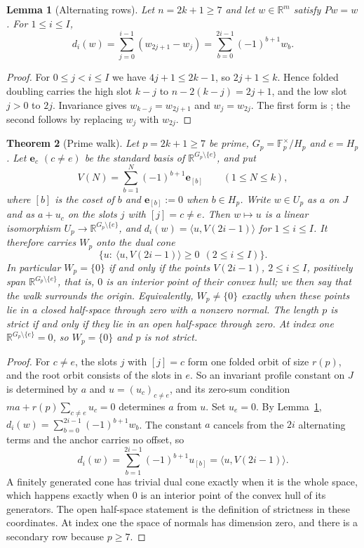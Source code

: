 \documentclass[11pt,reqno]{amsart}
\newtheorem{theorem}{Theorem}
\newtheorem{lemma}[theorem]{Lemma}
\newcommand{\R}{\mathbb R}
\newcommand{\F}{\mathbb F}
\begin{document}
\begin{lemma}[Alternating rows]\label{lem:rows}
Let \(n=2k+1\ge7\) and let \(w\in\R^m\) satisfy \(Pw=w\). For \(1\le i\le I\),
\[
 d_i(w)=\sum_{j=0}^{i-1}(w_{2j+1}-w_j)
       =\sum_{b=0}^{2i-1}(-1)^{b+1}w_b .
\]
\end{lemma}
\begin{proof}
For \(0\le j<i\le I\) we have \(4j+1\le 2k-1\), so \(2j+1\le k\). Hence folded doubling carries the high slot \(k-j\) to \(n-2(k-j)=2j+1\), and the low slot \(j>0\) to \(2j\). Invariance gives \(w_{k-j}=w_{2j+1}\) and \(w_j=w_{2j}\). The first form is \cite[Section~3]{G10}; the second follows by replacing \(w_j\) with \(w_{2j}\).
\end{proof}

\begin{theorem}[Prime walk]\label{th:walk}
Let \(p=2k+1\ge7\) be prime, \(G_p=\F_p^\times/H_p\) and \(e=H_p\). Let \(\mathbf e_c\) \((c\ne e)\) be the standard basis of \(\R^{G_p\setminus\{e\}}\), and put
\[
 V(N)=\sum_{b=1}^{N}(-1)^{b+1}\mathbf e_{[b]}\qquad(1\le N\le k),
\]
where \([b]\) is the coset of \(b\) and \(\mathbf e_{[b]}:=0\) when \(b\in H_p\). Write \(w\in U_p\) as \(a\) on \(J\) and as \(a+u_c\) on the slots \(j\) with \([j]=c\ne e\). Then \(w\mapsto u\) is a linear isomorphism \(U_p\to\R^{G_p\setminus\{e\}}\), and \(d_i(w)=\langle u,V(2i-1)\rangle\) for \(1\le i\le I\). It therefore carries \(W_p\) onto the dual cone
\[
 \{u:\ \langle u,V(2i-1)\rangle\ge0\ \ (2\le i\le I)\}.
\]
In particular \(W_p=\{0\}\) if and only if the points \(V(2i-1)\), \(2\le i\le I\), positively span \(\R^{G_p\setminus\{e\}}\), that is, \(0\) is an interior point of their convex hull; we then say that the walk \emph{surrounds the origin}. Equivalently, \(W_p\ne\{0\}\) exactly when these points lie in a closed half-space through zero with a nonzero normal. The length \(p\) is strict if and only if they lie in an open half-space through zero. At index one \(\R^{G_p\setminus\{e\}}=0\), so \(W_p=\{0\}\) and \(p\) is not strict.
\end{theorem}
\begin{proof}
For \(c\ne e\), the slots \(j\) with \([j]=c\) form one folded orbit of size \(r(p)\), and the root orbit consists of the slots in \(e\). So an invariant profile constant on \(J\) is determined by \(a\) and \(u=(u_c)_{c\ne e}\), and its zero-sum condition \(ma+r(p)\sum_{c\ne e}u_c=0\) determines \(a\) from \(u\). Set \(u_e=0\). By Lemma~\ref{lem:rows}, \(d_i(w)=\sum_{b=0}^{2i-1}(-1)^{b+1}w_b\). The constant \(a\) cancels from the \(2i\) alternating terms and the anchor carries no offset, so
\[
 d_i(w)=\sum_{b=1}^{2i-1}(-1)^{b+1}u_{[b]}=\langle u,V(2i-1)\rangle .
\]
A finitely generated cone has trivial dual cone exactly when it is the whole space, which happens exactly when \(0\) is an interior point of the convex hull of its generators. The open half-space statement is the definition of strictness in these coordinates. At index one the space of normals has dimension zero, and there is a secondary row because \(p\ge7\).
\end{proof}
\end{document}
